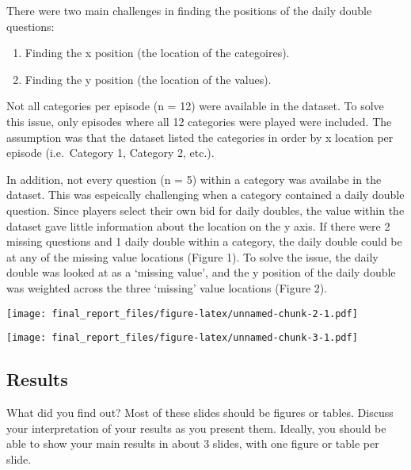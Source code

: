 \documentclass[]{article}
\providecommand{\tightlist}{%
  \setlength{\itemsep}{0pt}\setlength{\parskip}{0pt}}
\begin{document}
There were two main challenges in finding the positions of the daily
double questions:

\begin{enumerate}
\def\labelenumi{\arabic{enumi}.}
\tightlist
\item
  Finding the x position (the location of the categoires).
\item
  Finding the y position (the location of the values).
\end{enumerate}

Not all categories per episode (n = 12) were available in the dataset.
To solve this issue, only episodes where all 12 categories were played
were included. The assumption was that the dataset listed the categories
in order by x location per episode (i.e.~Category 1, Category 2, etc.).

In addition, not every question (n = 5) within a category was availabe
in the dataset. This was espeically challenging when a category
contained a daily double question. Since players select their own bid
for daily doubles, the value within the dataset gave little information
about the location on the y axis. If there were 2 missing questions and
1 daily double within a category, the daily double could be at any of
the missing value locations (Figure 1). To solve the issue, the daily
double was looked at as a `missing value', and the y position of the
daily double was weighted across the three `missing' value locations
(Figure 2).

\texttt{[image: final\_report\_files/figure-latex/unnamed-chunk-2-1.pdf]}

\texttt{[image: final\_report\_files/figure-latex/unnamed-chunk-3-1.pdf]}

\hypertarget{results}{%
\subsection{Results}\label{results}}

What did you find out? Most of these slides should be figures or tables.
Discuss your interpretation of your results as you present them.
Ideally, you should be able to show your main results in about 3 slides,
with one figure or table per slide.
\end{document}

